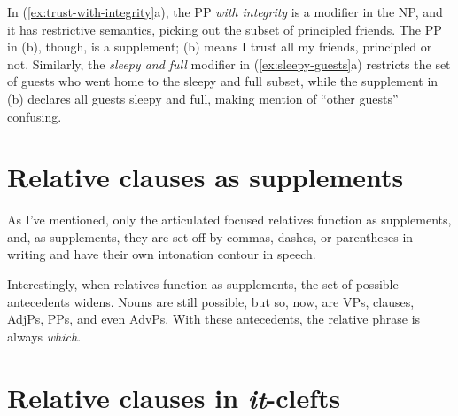In (\ref{ex:trust-with-integrity}a), the PP \textit{with integrity} is a modifier in the NP, and it has restrictive semantics, picking out the subset of principled friends. The PP in (b), though, is a supplement; (b) means I trust all my friends, principled or not. Similarly, the \textit{sleepy and full} modifier in (\ref{ex:sleepy-guests}a) restricts the set of guests who went home to the sleepy and full subset, while the supplement in (b) declares all guests sleepy and full, making mention of ``other guests'' confusing.

\section{Relative clauses as supplements} \label{sec:rel-clause-supps}

As I've mentioned, only the articulated focused relatives function as supplements, and, as supplements, they are set off by commas, dashes, or parentheses in writing and have their own intonation contour in speech.

\ea
    \z
\z

Interestingly, when relatives function as supplements, the set of possible antecedents widens. Nouns are still possible, but so, now, are VPs, clauses, AdjPs, PPs, and even AdvPs. With these antecedents, the relative phrase is always \textit{which}.

\ea
    \z
\z

\section{Relative clauses in \textit{it}-clefts}

